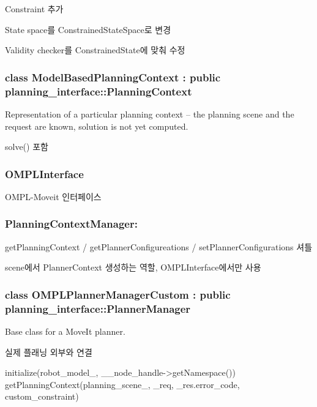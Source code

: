 
\begin{DoxyItemize}
\item Constraint 추가
\item State space를 Constrained\+State\+Space로 변경
\item Validity checker를 Constrained\+State에 맞춰 수정
\end{DoxyItemize}

\subsubsection*{class Model\+Based\+Planning\+Context \+: public planning\+\_\+interface\+::\+Planning\+Context}


\begin{DoxyItemize}
\item Representation of a particular planning context -- the planning scene and the request are known, solution is not yet computed.
\item solve() 포함
\end{DoxyItemize}

\subsubsection*{O\+M\+P\+L\+Interface}


\begin{DoxyItemize}
\item O\+M\+P\+L-\/\+Moveit 인터페이스
\end{DoxyItemize}

\subsubsection*{Planning\+Context\+Manager\+:}


\begin{DoxyItemize}
\item get\+Planning\+Context / get\+Planner\+Configureations / set\+Planner\+Configurations 셔틀
\item scene에서 Planner\+Context 생성하는 역할, O\+M\+P\+L\+Interface에서만 사용
\end{DoxyItemize}

\subsubsection*{class O\+M\+P\+L\+Planner\+Manager\+Custom \+: public planning\+\_\+interface\+::\+Planner\+Manager}


\begin{DoxyItemize}
\item Base class for a Move\+It planner.
\item 실제 플래닝 외부와 연결 
\begin{DoxyCode}
initialize(robot\_model\_, \_\_node\_handle->getNamespace())
getPlanningContext(planning\_scene\_, \_req, \_res.error\_code, custom\_constraint)
\end{DoxyCode}

\end{DoxyItemize}

